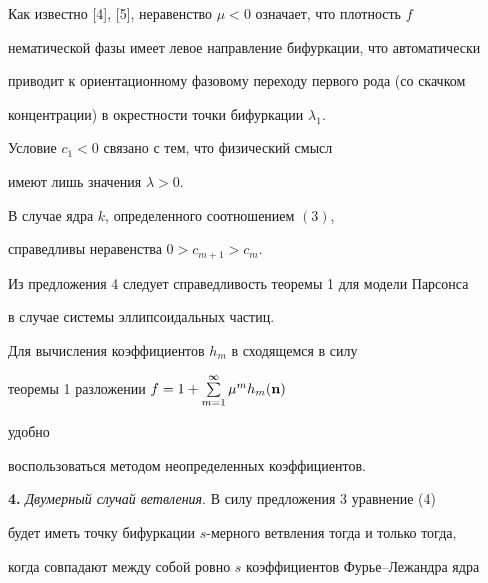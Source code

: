 Как известно [4], [5], неравенство $\mu<0$ означает, что плотность $f$


нематической фазы имеет левое направление бифуркации, что автоматически


приводит к ориентационному фазовому переходу первого рода (со скачком


концентрации) в окрестности точки бифуркации $\lambda_1$.





\begin{note}


Условие $c_1<0$ связано с тем, что физический смысл 


имеют лишь значения $\lambda>0$.


\end{note}





\begin{prop}


В случае ядра $k$, определенного соотношением $(3)$,


справедливы не\-ра\-вен\-ст\-ва $0>c_{m+1}>c_m$.


\end{prop}





Из предложения 4 следует справедливость теоремы 1 для модели Парсонса 


в случае системы эллипсоидальных частиц.





\begin{note}


Для вычисления коэффициентов $h_m$ в сходящемся в силу 


теоремы 1 разложении $f=1+\sum\limits^\infty_{m=1}\mu^m h_m(\bold n)$ 


удобно


воспользоваться методом неопределенных коэффициентов.


\end{note}





{\bf 4.} {\it Двумерный случай ветвления}. В силу предложения 3 уравнение (4) 


будет иметь точку бифуркации $s$-мерного ветвления тогда и только тогда, 


когда совпадают между собой ровно $s$ коэффициентов Фурье--Лежандра ядра 


